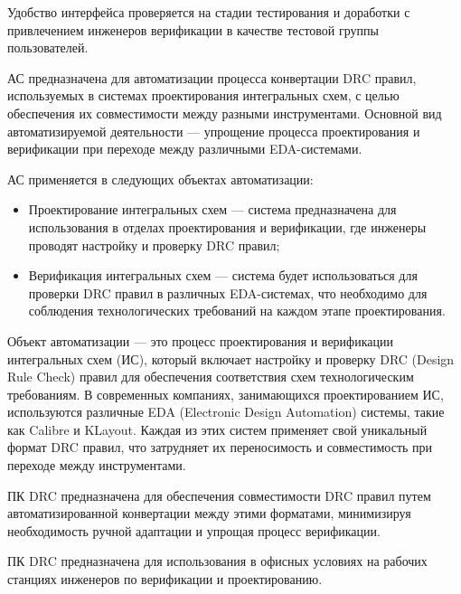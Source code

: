 Удобство интерфейса проверяется на стадии тестирования
и доработки с привлечением инженеров верификации
в качестве тестовой группы пользователей.


АС предназначена для автоматизации процесса конвертации DRC правил,
используемых в системах проектирования интегральных схем,
с целью обеспечения их совместимости между разными инструментами.
Основной вид автоматизируемой деятельности --- упрощение процесса
проектирования и верификации при переходе между различными EDA-системами.

АС применяется в следующих объектах автоматизации:

\begin{itemize}
	\item Проектирование интегральных схем --- система предназначена
		для использования в отделах проектирования и верификации,
		где инженеры проводят настройку и проверку DRC правил;
	\item Верификация интегральных схем --- система будет использоваться
		для проверки DRC правил в различных EDA-системах,
		что необходимо для соблюдения технологических требований
		на каждом этапе проектирования.
\end{itemize}



Объект автоматизации --- это процесс проектирования
и верификации интегральных схем (ИС),
который включает настройку и проверку DRC (Design Rule Check) правил
для обеспечения соответствия схем технологическим требованиям.
В современных компаниях, занимающихся проектированием ИС,
используются различные EDA (Electronic Design Automation) системы,
такие как Calibre и KLayout.
Каждая из этих систем применяет свой уникальный формат DRC правил,
что затрудняет их переносимость
и совместимость при переходе между инструментами.

ПК DRC предназначена для обеспечения совместимости DRC
правил путем автоматизированной конвертации между этими форматами,
минимизируя необходимость ручной адаптации и упрощая процесс верификации. 


ПК DRC предназначена для использования в офисных условиях
на рабочих станциях инженеров по верификации и проектированию.


